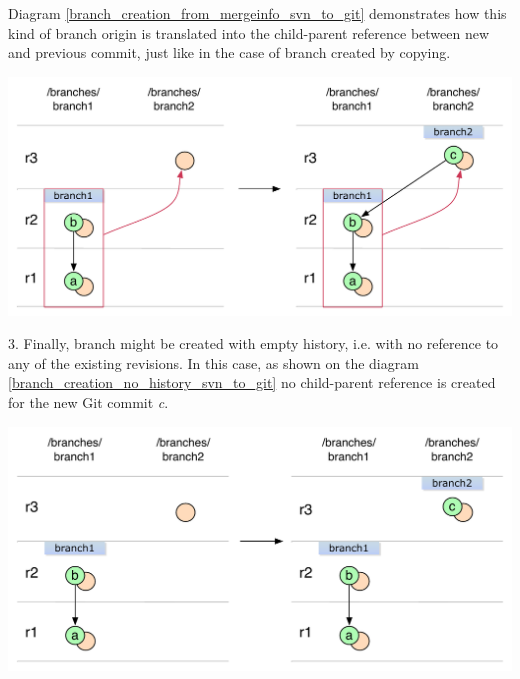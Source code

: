 \\\\
Diagram \ref{branch_creation_from_mergeinfo_svn_to_git} demonstrates how this kind of branch origin 
is translated into the child-parent reference between new and previous commit, just like in the 
case of branch created by copying.
\begin{center}
\includegraphics[width=\textwidth]{img/diagrams/branch_creation_from_mergeinfo_svn_to_git.pdf}%
\label{branch_creation_from_mergeinfo_svn_to_git}%
\end{center}

3. Finally, branch might be created with empty history, i.e. with no reference to any of the existing 
revisions. In this case, as shown on the diagram \ref{branch_creation_no_history_svn_to_git} no child-parent
reference is created for the new Git commit \emph{c}. 

\begin{center}
\includegraphics[width=\textwidth]{img/diagrams/branch_creation_no_history_svn_to_git.pdf}%
\label{branch_creation_no_history_svn_to_git}%
\end{center}

